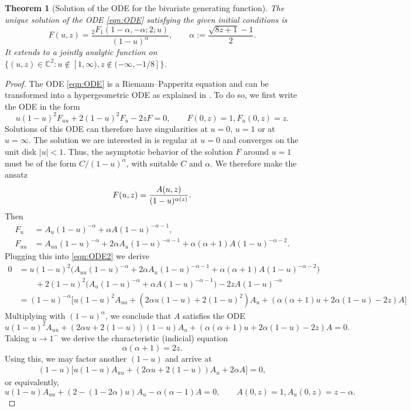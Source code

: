 \documentclass[11pt,a4paper]{article}
\numberwithin{equation}{section}
\newtheorem {theorem}{Theorem}[section]
\def\CC{\mathbb{C}}
\begin{document}
\begin{theorem}[Solution of the ODE for the bivariate generating function]\label{thm:SolODE}
The unique solution of the ODE \eqref{eqn:ODE} satisfying the given initial conditions is 
\begin{equation*}
    F(u,z) = \frac{{_2F_1}(1-\alpha,-\alpha;2;u)}{(1-u)^{\alpha}}, \qquad \alpha:=\frac{\sqrt{8z+1}-1}{2}.
\end{equation*}
It extends to a jointly analytic function on $\{(u,z)\in\CC^2:u\notin [1,\infty),z\notin(-\infty,-1/8]\}$.
\end{theorem}
\begin{proof}
The ODE \eqref{eqn:ODE} is a Riemann--Papperitz equation and can be transformed into a hypergeometric ODE as explained in \cite[p.\ 116]{Temme}.
To do so, we first write the ODE in the form
\begin{equation}\label{eqn:ODE2}
    u(1-u)^2 F_{uu} + 2(1-u)^2 F_{u} - 2z F  =0, \qquad F(0,z)=1, F_u(0,z)=z.
\end{equation} 
Solutions of this ODE can therefore have singularities at $u=0$, $u=1$ or at $u=\infty$. The solution we are interested in is regular at $u=0$ and converges on the unit disk $|u|<1$. Thus, the asymptotic behavior of the solution $F$ around $u=1$ must be of the form $C/(1-u)^\alpha$, with suitable $C$ and $\alpha$. We therefore make the ansatz
$$
F(u,z) = {A(u,z)\over (1-u)^{\alpha(z)}}.
$$
Then
\begin{align*}
    F_u &= A_u (1-u)^{-\alpha} +\alpha A (1-u)^{-\alpha-1},\\
    F_{uu} &= A_{uu} (1-u)^{-\alpha} + 2\alpha A_u (1-u)^{-\alpha-1} + \alpha(\alpha+1) A (1-u)^{-\alpha-2}.
\end{align*}
Plugging this into \eqref{eqn:ODE2} we derive
\begin{align*}
    0 &= u(1-u)^2\big(A_{uu}(1-u)^{-\alpha}+2\alpha A_u (1-u)^{-\alpha-1}+\alpha(\alpha+1)A(1-u)^{-\alpha-2}\big) \\
    &\qquad + 2(1-u)^2\big(A_u(1-u)^{-\alpha}+\alpha A (1-u)^{-\alpha-1}\big) -2zA(1-u)^{-\alpha}\\
    &=(1-u)^{-\alpha}\Big[u(1-u)^2A_{uu}+(2\alpha u(1-u)+2(1-u)^2)A_u + (\alpha(\alpha+1)u+2\alpha (1-u)-2z)A\Big]
\end{align*}
Multiplying with $(1-u)^{\alpha}$, we conclude that $A$ satisfies the ODE 
\begin{equation*}
    u(1-u)^2 A_{uu} + (2\alpha u+ 2(1-u)) (1-u) A_u + (\alpha (\alpha+1) u + 2\alpha (1-u) - 2z) A = 0.
\end{equation*}
Taking $u\to 1^-$ we derive the characteristic (indicial) equation 
\begin{equation}\label{eqn:indicial}
    \alpha(\alpha+1) = 2z.
\end{equation}
Using this, we may factor another $(1-u)$ and arrive at
\begin{align*}
     (1-u)\Big[u(1-u)A_{uu} + (2\alpha u + 2(1-u))A_u + 2\alpha A\Big] = 0,
\end{align*}
or equivalently,
\begin{equation*}
    u(1-u) A_{uu} + (2- (1-2\alpha) u) A_u - \alpha(\alpha-1)  A = 0, \qquad A(0,z)=1, A_u(0,z) = z-\alpha.
\end{equation*}


\end{proof}
\end{document}
